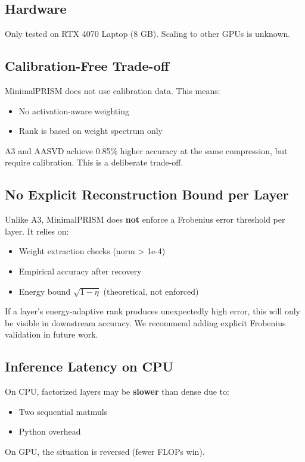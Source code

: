 \subsection{Hardware}

Only tested on RTX 4070 Laptop (8 GB). Scaling to other GPUs is unknown.

\subsection{Calibration-Free Trade-off}

MinimalPRISM does not use calibration data. This means:
\begin{itemize}
\item No activation-aware weighting
\item Rank is based on weight spectrum only

\end{itemize}
A3 and AASVD achieve 0.85\% higher accuracy at the same compression, 
but require calibration. This is a deliberate trade-off.

\subsection{No Explicit Reconstruction Bound per Layer}

Unlike A3, MinimalPRISM does \textbf{not} enforce a Frobenius error threshold 
per layer. It relies on:
\begin{itemize}
\item Weight extraction checks (norm > 1e-4)
\item Empirical accuracy after recovery
\item Energy bound $\sqrt{1 - \eta}$ (theoretical, not enforced)

\end{itemize}
If a layer's energy-adaptive rank produces unexpectedly high error, this 
will only be visible in downstream accuracy. We recommend adding explicit 
Frobenius validation in future work.

\subsection{Inference Latency on CPU}

On CPU, factorized layers may be \textbf{slower} than dense due to:
\begin{itemize}
\item Two sequential matmuls
\item Python overhead

\end{itemize}
On GPU, the situation is reversed (fewer FLOPs win).

